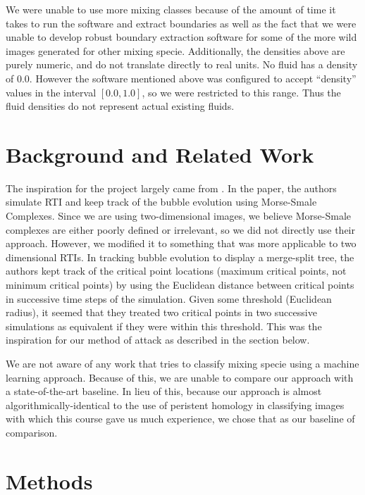 \documentclass[12pt, fullpage,letterpaper]{article}
\theoremstyle{definition}
\begin{document}
	We were unable to use more mixing classes because of the amount of time it takes to run the software and extract boundaries as well as the fact that we were unable to develop robust boundary extraction software for some of the more wild images generated for other mixing specie. Additionally, the densities above are purely numeric, and do not translate directly to real units. No fluid has a density of 0.0. However the software mentioned above was configured to accept ``density'' values in the interval $[0.0, 1.0]$, so we were restricted to this range. Thus the fluid densities do not represent actual existing fluids. %
	
	\section*{\normalfont Background and Related Work}
	The inspiration for the project largely came from \cite{paper}. In the paper, the authors simulate RTI and keep track of the bubble evolution using Morse-Smale Complexes. Since we are using two-dimensional images, we believe Morse-Smale complexes are either poorly defined or irrelevant, so we did not directly use their approach. However, we modified it to something that was more applicable to two dimensional RTIs. In tracking bubble evolution to display a merge-split tree, the authors kept track of the critical point locations (maximum critical points, not minimum critical points) by using the Euclidean distance between critical points in successive time steps of the simulation. Given some threshold (Euclidean radius), it seemed that they treated two critical points in two successive simulations as equivalent if they were within this threshold. This was the inspiration for our method of attack as described in the section below. 
	
	We are not aware of any work that tries to classify mixing specie using a machine learning approach. Because of this, we are unable to compare our approach with a state-of-the-art baseline. In lieu of this, because our approach is almost algorithmically-identical to the use of peristent homology in classifying images with which this course gave us much experience, we chose that as our baseline of comparison.
	
	\section*{\normalfont Methods}
\end{document}
